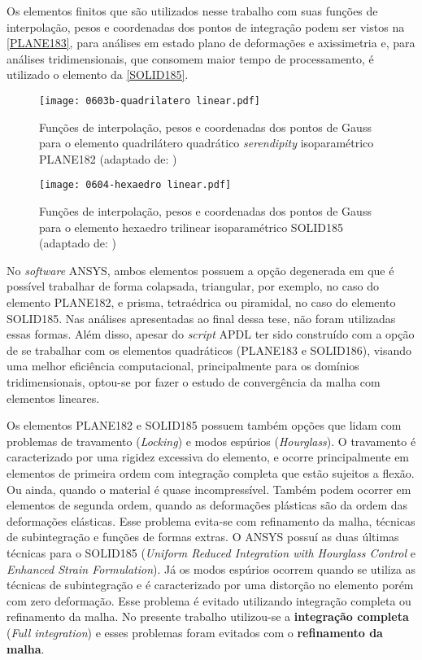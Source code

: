 Os elementos finitos que são utilizados nesse trabalho com suas funções de interpolação, pesos e coordenadas dos pontos de integração podem ser vistos na \autoref{PLANE183}, para análises em estado plano de deformações e axissimetria e, para análises tridimensionais, que consomem maior tempo de processamento, é utilizado o elemento da \autoref{SOLID185}.
\begin{figure}[H]
	\begin{center}
		\texttt{[image: 0603b-quadrilatero linear.pdf]}
	\end{center}
	\caption{\label{PLANE183}Funções de interpolação, pesos e coordenadas dos pontos de Gauss para o elemento quadrilátero quadrático \textit{serendipity} isoparamétrico PLANE182 (adaptado de: )}
\end{figure}
\begin{figure}[H]
	\begin{center}
		\texttt{[image: 0604-hexaedro linear.pdf]}
	\end{center}
	\caption{\label{SOLID185}Funções de interpolação, pesos e coordenadas dos pontos de Gauss para o elemento hexaedro trilinear isoparamétrico SOLID185 (adaptado de: )}
\end{figure}

No \textit{software} ANSYS, ambos elementos possuem a opção degenerada em que é possível trabalhar de forma colapsada, triangular, por exemplo, no caso do elemento PLANE182, e prisma, tetraédrica ou piramidal, no caso do elemento SOLID185. Nas análises apresentadas ao final dessa tese, não foram utilizadas essas formas. Além disso, apesar do \textit{script} APDL ter sido construído com a opção de se trabalhar com os elementos quadráticos (PLANE183 e SOLID186), visando uma melhor eficiência computacional, principalmente para os domínios tridimensionais, optou-se por fazer o estudo de convergência da malha com elementos lineares.

Os elementos PLANE182 e SOLID185 possuem também opções que lidam com problemas de travamento (\textit{Locking}) e modos espúrios (\textit{Hourglass}). O travamento é caracterizado por uma rigidez excessiva do elemento, e ocorre principalmente em elementos de primeira ordem com integração completa que estão sujeitos a flexão. Ou ainda, quando o material é quase incompressível. Também podem ocorrer em elementos de segunda ordem, quando as deformações plásticas são da ordem das deformações elásticas. Esse problema evita-se com refinamento da malha, técnicas de subintegração e funções de formas extras. O ANSYS possuí as duas últimas técnicas para o SOLID185 (\textit{Uniform Reduced Integration with Hourglass Control} e \textit{Enhanced Strain Formulation}). Já os modos espúrios ocorrem quando se utiliza as técnicas de subintegração e é caracterizado por uma distorção no elemento porém com zero deformação. Esse problema é evitado utilizando integração completa ou refinamento da malha. No presente trabalho utilizou-se a \textbf{integração completa} (\textit{Full integration}) e esses problemas foram evitados com o \textbf{refinamento da malha}. 

